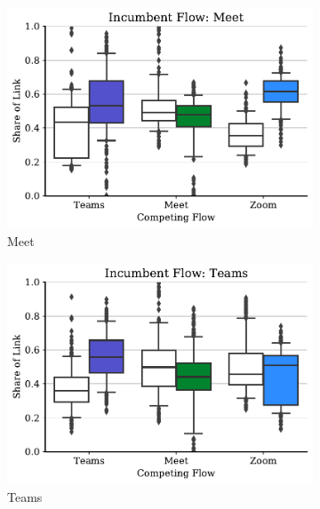 \begin{figure}[t!]
    \centering
    \begin{subfigure}[t]{.33\textwidth}
        \centering
        \includegraphics[width=1\textwidth]{figures/comp_all/box_plot_meet_ul_0.5_all.pdf}
        \caption{Meet}
      \label{subfig:meet_ul_box}
    \end{subfigure}\hfill
    \begin{subfigure}[t]{.33\textwidth}
        \centering
        \includegraphics[width=1\textwidth]{figures/comp_all/box_plot_teams_ul_0.5_all.pdf}
        \caption{Teams}
        \label{subfig:teams_ul_box}
    \end{subfigure}
    \begin{subfigure}[t]{.33\textwidth}
        \centering

\end{subfigure}
\end{figure}
